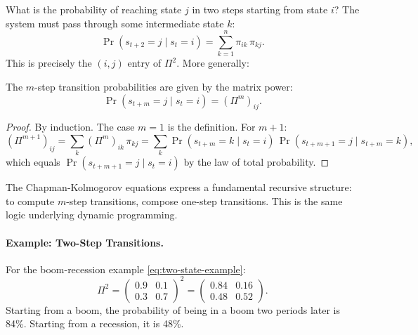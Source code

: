 What is the probability of reaching state $j$ in two steps starting from state $i$? The system must pass through some intermediate state $k$:
\begin{equation}
\Pr(s_{t+2} = j \mid s_t = i) = \sum_{k=1}^{n} \pi_{ik} \, \pi_{kj}.
\label{eq:two-step}
\end{equation}
This is precisely the $(i,j)$ entry of $\Pi^2$. More generally:

\begin{proposition}
\label{prop:chapman-kolmogorov}
The $m$-step transition probabilities are given by the matrix power:
\begin{equation}
\Pr(s_{t+m} = j \mid s_t = i) = (\Pi^m)_{ij}.
\label{eq:m-step}
\end{equation}
\end{proposition}

\begin{proof}
By induction. The case $m = 1$ is the definition. For $m + 1$:
\begin{equation}
(\Pi^{m+1})_{ij} = \sum_{k} (\Pi^m)_{ik} \, \pi_{kj} = \sum_{k} \Pr(s_{t+m} = k \mid s_t = i) \, \Pr(s_{t+m+1} = j \mid s_{t+m} = k),
\end{equation}
which equals $\Pr(s_{t+m+1} = j \mid s_t = i)$ by the law of total probability.
\end{proof}

The Chapman-Kolmogorov equations express a fundamental recursive structure: to compute $m$-step transitions, compose one-step transitions. This is the same logic underlying dynamic programming.

\paragraph{Example: Two-Step Transitions.}
For the boom-recession example \eqref{eq:two-state-example}:
\begin{equation}
\Pi^2 = \begin{pmatrix}
0.9 & 0.1 \\
0.3 & 0.7
\end{pmatrix}^2 = \begin{pmatrix}
0.84 & 0.16 \\
0.48 & 0.52
\end{pmatrix}.
\label{eq:two-step-example}
\end{equation}
Starting from a boom, the probability of being in a boom two periods later is 84\%. Starting from a recession, it is 48\%.

